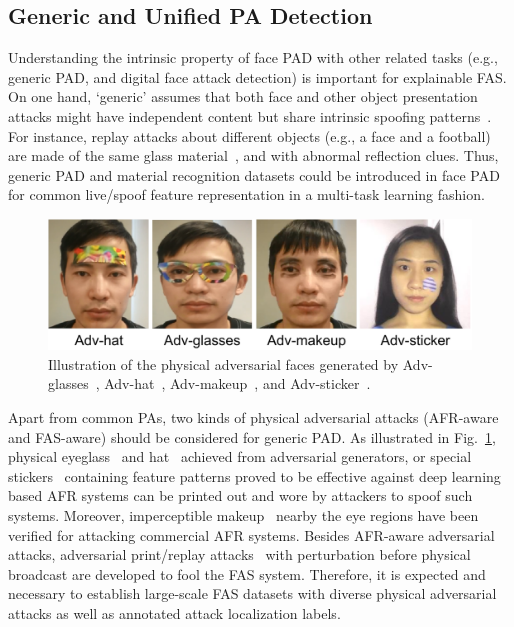 \documentclass[10pt,journal,compsoc]{IEEEtran}
\begin{document}
\vspace{-0.5em}
\subsection{Generic and Unified PA Detection}
Understanding the intrinsic property of face PAD with other related tasks (e.g., generic PAD, and digital face attack detection) is important for explainable FAS. On one hand, `generic' assumes that both face and other object presentation attacks might have independent content but share intrinsic spoofing patterns~\cite{stehouwer2020noise}. For instance, replay attacks about different objects (e.g., a face and a football) are made of the same glass material~\cite{yu2020face}, and with abnormal reflection clues. Thus, generic PAD and material recognition datasets could be introduced in face PAD for common live/spoof feature representation in a multi-task learning fashion. 



\begin{figure}
\centering
\includegraphics[scale=0.48]{Figures/adv.pdf}
\vspace{-0.6em}
  \caption{ 
   Illustration of the physical adversarial faces generated by Adv-glasses~\cite{sharif2019general}, Adv-hat~\cite{komkov2021advhat}, Adv-makeup~\cite{yin2021adv}, and Adv-sticker~\cite{guo2021meaningful}.
  }
  \vspace{-0.9em}
\label{fig:adv}
\end{figure}


Apart from common PAs, two kinds of physical adversarial attacks (AFR-aware and FAS-aware) should be considered for generic PAD. As illustrated in Fig.~\ref{fig:adv}, physical  eyeglass~\cite{sharif2019general} and hat~\cite{komkov2021advhat} achieved from adversarial generators, or
special stickers~\cite{guo2021meaningful} containing feature patterns proved to be effective against deep learning based AFR systems can be printed out and wore by attackers to spoof such systems. Moreover, imperceptible makeup~\cite{yin2021adv} nearby the eye regions have been verified for attacking commercial AFR systems. Besides AFR-aware adversarial attacks, adversarial print/replay attacks~\cite{zhang2019attacking} with perturbation before physical broadcast are developed to fool the FAS system. Therefore, it is expected and necessary to establish large-scale FAS datasets with diverse physical adversarial attacks as well as annotated attack localization labels. 
\end{document}
